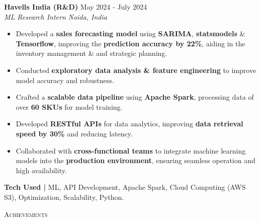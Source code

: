 \documentclass[letterpaper]{article}
\newcommand{\tinyBulletSep} { \vspace{1.2mm} }
\newcommand{\sectionSep} { \vspace{2.5mm} }
\newcommand{\lineunder} {
    \vspace*{-8pt} \\
    \hspace*{-15pt} \hrulefill \\
}
\newcommand{\header} [1] {
    {\hspace*{-18pt}\vspace*{6pt} {
        \fontfamily{qcs}\selectfont \large \scshape #1
    }}
    \vspace*{-6pt} \lineunder
    \vspace{1.1mm}
}
\newcommand{\experienceItem}[5]{
    \textbf{#1} \hfill #2 \\
    \textit{#3} \hfill \textit{#4} \\
    #5
}
\newcommand{\link}[2]{
    {\fontfamily{lmtt}\selectfont\href{#1}{#2}}
}
\begin{document}
\experienceItem{Havells India (R\&D)}{May 2024 - July 2024}{ML Research Intern}{Noida, India}{
\begin{itemize}
    \item Developed a \textbf{sales forecasting model} using \textbf{SARIMA}, \textbf{statsmodels} \& \textbf{Tensorflow}, improving the \textbf{prediction accuracy by 22\%}, aiding in the inventory management \& and strategic planning.
    \vspace{0.5mm}
    \item Conducted \textbf{exploratory data analysis \& feature engineering} to improve model accuracy and robustness.
    \vspace{0.5mm}

    \item Crafted a \textbf{scalable data pipeline} using \textbf{Apache Spark}, processing data of over \textbf{60 SKUs} for model training.
    \vspace{0.5mm}

    \item Developed \textbf{RESTful APIs} for data analytics, improving \textbf{data retrieval speed by 30\%} and reducing latency.
    \vspace{0.5mm}

    \item Collaborated with \textbf{cross-functional teams} to integrate machine learning models into the \textbf{production environment}, ensuring seamless operation and high availability.
    \tinyBulletSep

\end{itemize}
\textbf{Tech Used |} ML, API Development, Apache Spark, Cloud Computing (AWS S3), Optimization, Scalability, Python.
}

\sectionSep


\header{Achievements}


\end{document}
